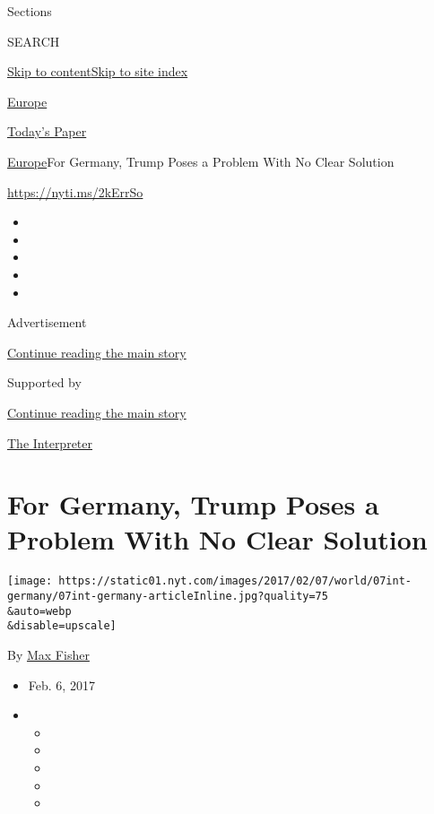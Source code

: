 Sections

SEARCH

\protect\hyperlink{site-content}{Skip to
content}\protect\hyperlink{site-index}{Skip to site index}

\href{https://www.nytimes.com/section/world/europe}{Europe}

\href{https://myaccount.nytimes.com/auth/login?response_type=cookie\&client_id=vi}{}

\href{https://www.nytimes.com/section/todayspaper}{Today's Paper}

\href{/section/world/europe}{Europe}\textbar{}For Germany, Trump Poses a
Problem With No Clear Solution

\url{https://nyti.ms/2kErrSo}

\begin{itemize}
\item
\item
\item
\item
\item
\end{itemize}

Advertisement

\protect\hyperlink{after-top}{Continue reading the main story}

Supported by

\protect\hyperlink{after-sponsor}{Continue reading the main story}

\href{/column/the-interpreter}{The Interpreter}

\hypertarget{for-germany-trump-poses-a-problem-with-no-clear-solution}{%
\section{For Germany, Trump Poses a Problem With No Clear
Solution}\label{for-germany-trump-poses-a-problem-with-no-clear-solution}}

\texttt{[image: https://static01.nyt.com/images/2017/02/07/world/07int-germany/07int-germany-articleInline.jpg?quality=75\\\&auto=webp\\\&disable=upscale]}

By \href{https://www.nytimes.com/by/max-fisher}{Max Fisher}

\begin{itemize}
\item
  Feb. 6, 2017
\item
  \begin{itemize}
  \item
  \item
  \item
  \item
  \item
  \end{itemize}
\end{itemize}

